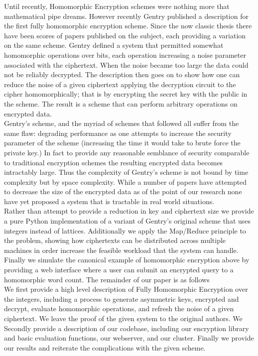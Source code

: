 \documentclass[11pt]{article}
\begin{document}
	Until recently, Homomorphic Encryption schemes were nothing more that mathematical pipe dreams. However recently Gentry published a description for the first fully homomorphic encryption scheme. Since the now classic thesis there have been scores of papers published on the subject, each providing a variation on the same scheme. Gentry defined a system that permitted somewhat homomorphic operations over bits, each operation increasing a noise parameter associated with the ciphertext. When the noise became too large the data could not be reliably decrypted. The description then goes on to show how one can reduce the noise of a given ciphertext applying the decryption circuit to the cipher homomorphically; that is by encrypting the secret key with the public in the scheme. The result is a scheme that can perform arbitrary operations on encrypted data.\\

	Gentry's scheme, and the myriad of schemes that followed all suffer from the same flaw: degrading performance as one attempts to increase the security parameter of the scheme (increasing the time it would take to brute force the private key.) In fact to provide any reasonable semblance of security comparable to traditional encryption schemes the resulting encrypted data becomes intractably large. Thus the complexity of Gentry's scheme is not bound by time complexity but by space complexity. While a number of papers have attempted to decrease the size of the encrypted data as of the point of our research none have yet proposed a system that is tractable in real world situations.\\

	Rather than attempt to provide a reduction in key and ciphertext size we provide a pure Python implementation of a variant of Gentry's original scheme that uses integers instead of lattices. Additionally we apply the Map/Reduce principle to the problem, showing how ciphertexts can be distributed across multiple machines in order increase the feasible workload that the system can handle. Finally we simulate the canonical example of homomorphic encryption above by providing a web interface where a user can submit an encrypted query to a homomorphic word count. The remainder of our paper is as follows\\

	We first provide a high level description of Fully Homomorphic Encryption over the integers, including a process to generate asymmetric keys, encrypted and decrypt, evaluate homomorphic operations, and refresh the noise of a given ciphertext. We leave the proof of the given system to the original authors. We Secondly provide a description of our codebase, including our encryption library and basic evaluation functions, our webserver, and our cluster. Finally we provide our results and reiterate the complications with the given scheme.
\end{document}
